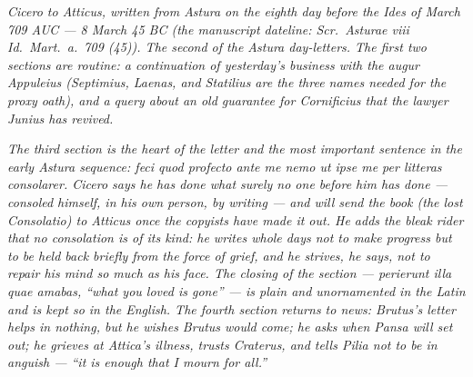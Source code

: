
\textit{Cicero to Atticus, written from Astura on the
eighth day before the Ides of March 709 AUC --- 8
March 45 BC (the manuscript dateline: \textit{Scr.\
Asturae viii Id.\ Mart.\ a.\ 709 (45)}). The
second of the Astura day-letters. The first two
sections are routine: a continuation of yesterday's
business with the augur Appuleius (Septimius, Laenas,
and Statilius are the three names needed for the
proxy oath), and a query about an old guarantee for
Cornificius that the lawyer Junius has revived.}

\textit{The third section is the heart of the letter
and the most important sentence in the early Astura
sequence: \textit{feci quod profecto ante me nemo ut
ipse me per litteras consolarer}. Cicero says he has
done what surely no one before him has done ---
consoled himself, in his own person, by writing ---
and will send the book (the lost \textit{Consolatio})
to Atticus once the copyists have made it out. He
adds the bleak rider that no consolation is of its
kind: he writes whole days not to make progress but
to be held back briefly from the force of grief, and
he strives, he says, not to repair his mind so much
as his face. The closing of the section ---
\textit{perierunt illa quae amabas}, ``what you loved
is gone'' --- is plain and unornamented in the Latin
and is kept so in the English. The fourth section
returns to news: Brutus's letter helps in nothing,
but he wishes Brutus would come; he asks when Pansa
will set out; he grieves at Attica's illness, trusts
Craterus, and tells Pilia not to be in anguish ---
``it is enough that I mourn for all.''}
